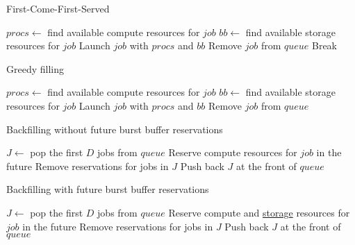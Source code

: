 \documentclass[thesis-en.tex]{subfiles}
\begin{document}
\begin{algorithm}[htb!]
\caption{First-Come-First-Served}
\label{alg:fcfs}
\begin{algorithmic}[1]
    \State $procs \gets$ find available compute resources for $job$
    \State $bb \gets$ find available storage resources for $job$
        \State Launch $job$ with $procs$ and $bb$
        \State Remove $job$ from $queue$
    \Else
        \State Break
    \EndIf
  \EndFor
\EndProcedure
\end{algorithmic}
\end{algorithm}

\begin{algorithm}[htb!]
\caption{Greedy filling}
\label{alg:filler}
\begin{algorithmic}[1]
    \State $procs \gets$ find available compute resources for $job$
    \State $bb \gets$ find available storage resources for $job$
        \State Launch $job$ with $procs$ and $bb$
        \State Remove $job$ from $queue$
    \EndIf
  \EndFor
\EndProcedure
\end{algorithmic}
\end{algorithm}

\begin{algorithm}[htb!]
\caption{Backfilling without future burst buffer reservations}
\label{alg:backfill-nores}
\begin{algorithmic}[1]
  \State {}
  \State $J \gets$ pop the first $D$ jobs from $queue$
  \State Reserve compute resources for $job$ in the future
  \EndFor
  \State {} 
  \State Remove reservations for jobs in $J$
  \State Push back $J$ at the front of $queue$
\EndProcedure
\end{algorithmic}
\end{algorithm}

\begin{algorithm}[htb!]
\caption{Backfilling with future burst buffer reservations}
\label{alg:backfill}
\begin{algorithmic}[1]
  \State {}
  \State $J \gets$ pop the first $D$ jobs from $queue$
  \State Reserve compute and \underline{storage} resources for $job$ in the future
  \EndFor
  \State {}
  \State Remove reservations for jobs in $J$
  \State Push back $J$ at the front of $queue$
\EndProcedure
\end{algorithmic}
\end{algorithm}
\end{document}
